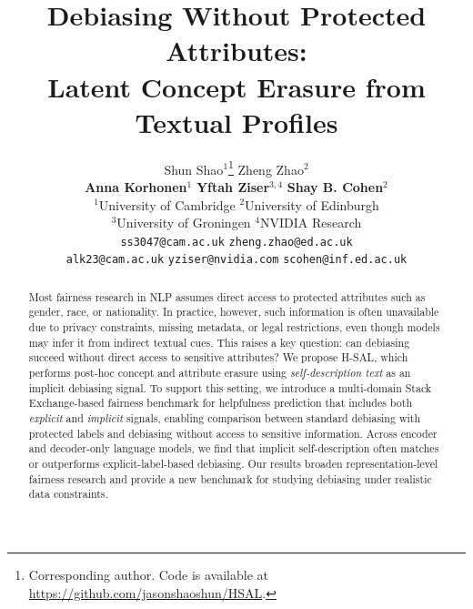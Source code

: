 \documentclass[11pt]{article}
\title{Debiasing Without Protected Attributes: \\ Latent Concept Erasure from Textual Profiles}
\author{Shun Shao$^1$\thanks{Corresponding author. Code is available at \url{https://github.com/jasonshaoshun/HSAL}.} \qquad  Zheng Zhao$^2$ \\  \textbf{Anna Korhonen}$^1$  \qquad
\textbf{Yftah Ziser}$^{3,4}$ \qquad \textbf{Shay B. Cohen}$^2$ \qquad  \\
$^1$University of Cambridge \qquad $^2$University of Edinburgh \\
$^3$University of Groningen \qquad $^4$NVIDIA Research   \\
\texttt{ss3047@cam.ac.uk} \quad \texttt{zheng.zhao@ed.ac.uk} \\
\texttt{alk23@cam.ac.uk} \quad \texttt{yziser@nvidia.com} \quad \texttt{scohen@inf.ed.ac.uk} }
\begin{document}
\maketitle
\begin{abstract}
Most fairness research in NLP assumes direct access to protected attributes such as gender, race, or nationality. In practice, however, such information is often unavailable due to privacy constraints, missing metadata, or legal restrictions, even though models may infer it from indirect textual cues. This raises a key question: can debiasing succeed without direct access to sensitive attributes? We propose H-\textsc{SAL}, which performs post-hoc concept and attribute erasure using \emph{self-description text} as an implicit debiasing signal. To support this setting, we introduce a multi-domain Stack Exchange-based fairness benchmark for helpfulness prediction that includes both \emph{explicit} and \emph{implicit} signals, enabling comparison between standard debiasing with protected labels and debiasing without access to sensitive information. Across encoder and decoder-only language models, we find that implicit self-description often matches or outperforms explicit-label-based debiasing. Our results broaden representation-level fairness research and provide a new benchmark for studying debiasing under realistic data constraints.
\end{abstract}
\end{document}
